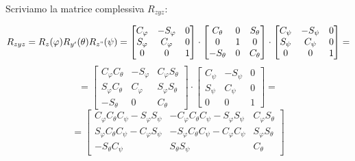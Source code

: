 \paragraph{}
Scriviamo la matrice complessiva $R_{zyz}$:

\begin{equation*}
	R_{zyz} = R_z(\varphi)R_{y'}(\theta)R_{z"}(\psi) =
	\begin{bmatrix}
		C_{\varphi} & -S_{\varphi} & 0 \\
		S_{\varphi} & C_{\varphi} & 0 \\
		0 & 0 & 1
	\end{bmatrix}
	\cdot
	\begin{bmatrix}
		C_{\theta} & 0 & S_{\theta} \\
		0 & 1 & 0 \\
		-S_{\theta} & 0 & C_{\theta}
	\end{bmatrix}
	\cdot
	\begin{bmatrix}
		C_{\psi} & -S_{\psi} & 0 \\
		S_{\psi} & C_{\psi} & 0 \\
		0 & 0 & 1
	\end{bmatrix}
	=
\end{equation*}
\begin{equation*}
	=
	\begin{bmatrix}
		C_{\varphi}C_{\theta} & -S_{\varphi} & C_{\varphi}S_{\theta} \\
		S_{\varphi}C_{\theta} & C_{\varphi} & S_{\varphi}S_{\theta} \\
		-S_{\theta} & 0 & C_{\theta}
	\end{bmatrix}
	\cdot
	\begin{bmatrix}
		C_{\psi} & -S_{\psi} & 0 \\
		S_{\psi} & C_{\psi} & 0 \\
		0 & 0 & 1
	\end{bmatrix}
	=
\end{equation*}
\begin{equation*}
	=
	\begin{bmatrix}
		C_{\varphi}C_{\theta}C_{\psi} - S_{\varphi}S_{\psi} & -C_{\varphi}C_{\theta}C_{\psi} - S_{\varphi}S_{\psi} & C_{\varphi}S_{\theta} \\
		S_{\varphi}C_{\theta}C_{\psi} - C_{\varphi}S_{\psi} & -S_{\varphi}C_{\theta}C_{\psi} - C_{\varphi}C_{\psi} & S_{\varphi}S_{\theta} \\
		-S_{\theta}C_{\psi} & S_{\theta}S_{\psi} & C_{\theta}
	\end{bmatrix}
\end{equation*}

